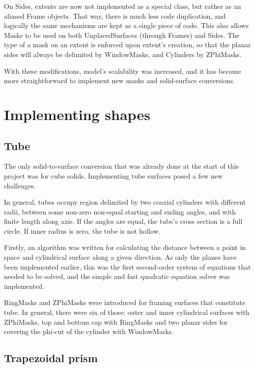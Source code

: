 \documentclass[12pt, a4paper]{article}
\begin{document}
On Sides, extents are now not implemented as a special class, but rather as an aliased Frame objects. That way, there is much less code duplication, and logically the same mechanisms are kept as a single piece of code. This also allows Masks to be used on both UnplacedSurfaces (through Frames) and Sides. The type of a mask on an extent is enforced upon extent's creation, so that the planar sides will always be delimited by WindowMasks, and Cylinders by ZPhiMasks.

With these modifications, model's scalability was increased, and it has become more straightforward to implement new masks and solid-surface conversions.


\section{Implementing shapes}

\subsection{Tube}

The only solid-to-surface conversion that was already done at the start of this project was for cube solids. Implementing tube surfaces posed a few new challenges.

In general, tubes occupy region delimited by two coaxial cylinders with different radii, between some non-zero non-equal starting and ending angles, and with finite length along axis. If the angles are equal, the tube's cross section is a full circle. If inner radius is zero, the tube is not hollow.

Firstly, an algorithm was written for calculating the distance between a point in space and cylindrical surface along a given direction. As only the planes have been implemented earlier, this was the first second-order system of equations that needed to be solved, and the simple and fast quadratic equation solver was implemented.

RingMasks and ZPhiMasks were introduced for framing surfaces that constitute tube. In general, there were six of those: outer and inner cylindrical surfaces with ZPhiMasks, top and bottom cap with RingMasks and two planar sides for covering the phi-cut of the cylinder with WindowMasks.


\subsection{Trapezoidal prism}
\end{document}
